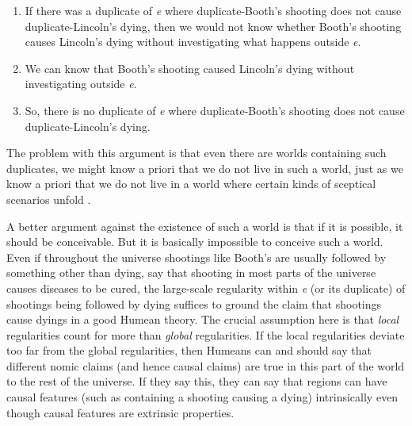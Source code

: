 \begin{enumerate}
\item If there was a duplicate of \textit{e} where dup\-lic\-ate-Booth's shooting does not cause duplicate-Lincoln's dying, then we would not know whether Booth's shooting causes Lincoln's dying without investigating what happens outside \textit{e}.
\item We can know that Booth's shooting caused Lincoln's dying without investigating outside \textit{e}.
\item So, there is no duplicate of \textit{e} where dup\-li\-cate-Booth's shooting does not cause dup\-li\-cate-Lincoln's dying.
\end{enumerate}

\noindent The problem with this argument is that even there are worlds containing such duplicates, we might know a priori that we do not live in such a world, just as we know a priori that we do not live in a world where certain kinds of sceptical scenarios unfold \citep{Hawthorne2002, WeathersonSRE}.

A better argument against the existence of such a world is that if it is possible, it should be conceivable. But it is basically impossible to conceive such a world. Even if throughout the universe shootings like Booth's are usually followed by something other than dying, say that shooting in most parts of the universe causes diseases to be cured, the large-scale regularity within \textit{e} (or its duplicate) of shootings being followed by dying suffices to ground the claim that shootings cause dyings in a good Humean theory. The crucial assumption here is that \textit{local }regularities count for more than \textit{global} regularities. If the local regularities deviate too far from the global regularities, then Humeans can and should say that different nomic claims (and hence causal claims) are true in this part of the world to the rest of the universe. If they say this, they can say that regions can have causal features (such as containing a shooting causing a dying) intrinsically even though causal features are extrinsic properties.

